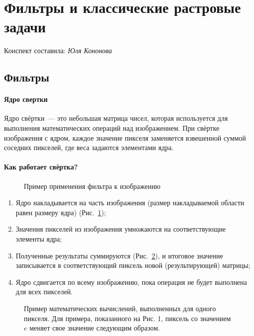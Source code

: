 \section{Фильтры и классические растровые задачи}
\begin{center}
    Конспект составила: \textit{Юля Кононова}
\end{center}

\subsection{Фильтры}
\paragraph{Ядро свертки}
Ядро свёртки~--- это небольшая матрица чисел, которая используется для выполнения математических операций над изображением. При свёртке изображения с ядром, каждое значение пикселя заменяется взвешенной суммой соседних пикселей, где веса задаются элементами ядра.
\paragraph{Как работает свёртка?}

\begin{figure}[h]
    \centering
    
    \caption{Пример применения фильтра к изображению}
    \label{fig:kernel}
\end{figure}

\begin{enumerate}
    \item Ядро накладывается на часть изображения (размер накладываемой области равен размеру ядра) (Рис.~\ref{fig:kernel});
    \item Значения пикселей из изображения умножаются на соответствующие элементы ядра;
    \item Полученные результаты суммируются (Рис.~\ref{fig:kernel_2}), и итоговое значение записывается в соответствующий пиксель новой (результирующей) матрицы;
    \item Ядро сдвигается по всему изображению, пока операция не будет выполнена для всех пикселей.
\end{enumerate}

\begin{figure}[h]
    \centering
    
    \caption{Пример математических вычислений, выполненных для одного пикселя. Для примера, показанного на Рис. 1, пиксель со значением $e$ меняет свое значение следующим образом.}
    \label{fig:kernel_2}
\end{figure}

